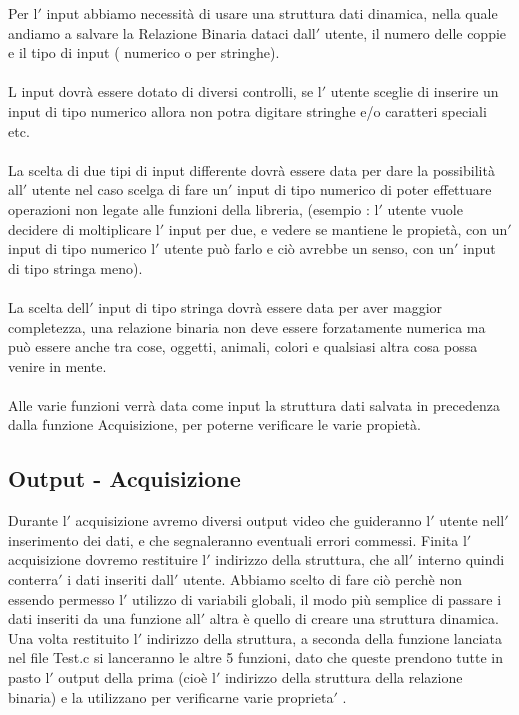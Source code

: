 \documentclass[11pt, a4paper, titlepage, block]{article}
\begin{document}
	
	Per l$'$ input abbiamo necessit\`a di usare una struttura dati dinamica, nella quale andiamo a salvare la Relazione Binaria dataci dall$'$ utente, il numero delle coppie e il tipo di input ( numerico o per stringhe).\\
	\\
	L input dovr\`a essere dotato di diversi controlli, se l$'$ utente sceglie di inserire un input di tipo numerico allora non potra digitare stringhe e/o caratteri speciali etc.\\
	\\
	La scelta di due tipi di input differente dovr\`a essere data per dare la possibilit\`a all$'$ utente nel caso scelga di fare un$'$ input di tipo numerico di poter effettuare operazioni non legate alle funzioni della libreria, (esempio : l$'$ utente vuole decidere di moltiplicare l$'$ input per due, e vedere se mantiene le propiet\`a, con un$'$ input di tipo numerico l$'$ utente può farlo e ciò avrebbe un senso, con un$'$ input di tipo stringa meno).\\
	\\
	La scelta dell$'$ input di tipo stringa dovr\`a essere data per aver maggior completezza, una relazione binaria non deve essere forzatamente numerica ma può essere anche tra cose, oggetti, animali, colori e qualsiasi altra cosa possa venire in mente.\\
	\\
	Alle varie funzioni verr\`a data come input la struttura dati salvata in precedenza dalla funzione Acquisizione, per poterne verificare le varie propiet\`a.\\
	
	
	
	
	\newpage        
	\subsection{Output - Acquisizione}
	Durante l$'$ acquisizione avremo diversi output video che guideranno l$'$ utente nell$'$ inserimento dei dati, e che segnaleranno eventuali errori commessi.
	Finita l$'$ acquisizione dovremo restituire l$'$ indirizzo della struttura, che all$'$ interno quindi conterra$'$  i dati inseriti dall$'$ utente. Abbiamo scelto di fare ciò perch\`e non essendo permesso l$'$ utilizzo di variabili globali, il modo più semplice di passare i dati inseriti da una funzione all$'$ altra \`e  quello di creare una struttura dinamica.
	Una volta restituito l$'$ indirizzo della struttura, a seconda della funzione lanciata nel file Test.c si lanceranno le altre 5 funzioni, dato che queste prendono tutte in pasto l$'$ output della prima (cio\`e l$'$ indirizzo della struttura della relazione binaria) e la utilizzano per verificarne varie proprieta$'$ .\\
	\\
\end{document}
